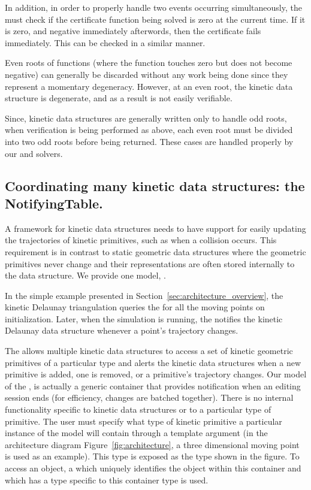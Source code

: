 In addition, in order to properly handle two events occurring
simultaneously, the  must check if the certificate function
being solved is zero at the current time. If it is zero, and negative
immediately afterwords, then the certificate fails immediately. This
can be checked in a similar manner.

Even roots of functions (where the function touches zero but does
not become negative) can generally be discarded without any work being
done since they represent a momentary degeneracy. However, at an even
root, the kinetic data structure is degenerate, and as a result is not
easily verifiable. 

Since, kinetic data structures are generally written only to handle odd
roots, when verification is being performed as above, each even root
must be divided into two odd roots before being returned. These cases
are handled properly by our  and solvers.

\subsection{Coordinating many kinetic data structures: the NotifyingTable.}
\label{sec:moving_object_table}

A framework for kinetic data structures needs to have support for
easily updating the trajectories of kinetic primitives, such as when a
collision occurs. This requirement is in contrast to static geometric
data structures where the geometric primitives never change and their
representations are often stored internally to the data structure. We
provide one model, .

In the simple example presented in
Section~\ref{sec:architecture_overview}, the kinetic Delaunay
triangulation queries the  for all the moving points on
initialization. Later, when the simulation is running, the
 notifies the kinetic Delaunay data structure whenever a point's
trajectory changes.

The  allows multiple kinetic data structures to
access a set of kinetic geometric primitives of a particular type and
alerts the kinetic data structures when a new primitive is added, one
is removed, or a primitive's trajectory changes. Our model of the
,  is actually a generic
container that provides notification when an editing session ends (for
efficiency, changes are batched together). There is no internal
functionality specific to kinetic data structures or to a particular
type of primitive. The user must specify what type of kinetic
primitive a particular instance of the  model
will contain through a template argument (in the architecture diagram
Figure~\ref{fig:architecture}, a three dimensional moving point is
used as an example). This type is exposed as the  type
shown in the figure. To access an object, a  which uniquely
identifies the object within this container and which has a type
specific to this container type is used.


